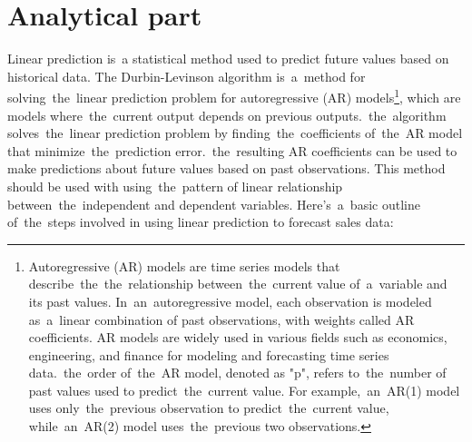 
\chapter{Analytical part}\label{sec:analytical}

Linear prediction is~a statistical method used to predict future values based on historical data.
The Durbin-Levinson algorithm is~a~method for solving~the~linear prediction problem for autoregressive (AR)
models\footnote{Autoregressive (AR) models are time series models that describe~the~the~relationship between~the~current
value of~a~variable and its past values. In~an~autoregressive model, each observation is modeled as~a~linear
combination of past observations, with weights called AR coefficients. AR models are widely used in various fields
such as economics, engineering, and finance for modeling and forecasting time series data.~the~order of~the~AR model, denoted as "p", refers to~the~number of past values used to predict~the~current value. For example,~an~AR(1) model uses
only~the~previous observation to predict~the~current value, while~an~AR(2) model uses~the~previous two observations.},
which are models where~the~current output depends on previous outputs.~the~algorithm solves~the~linear prediction
problem by finding~the~coefficients of~the~AR model that minimize~the~prediction error.~the~resulting AR coefficients
can be used to make predictions about future values based on past observations. This method should be used with
using~the~pattern of linear relationship between~the~independent and dependent variables.
Here's~a~basic outline of~the~steps involved in using linear prediction to forecast sales data:\\
